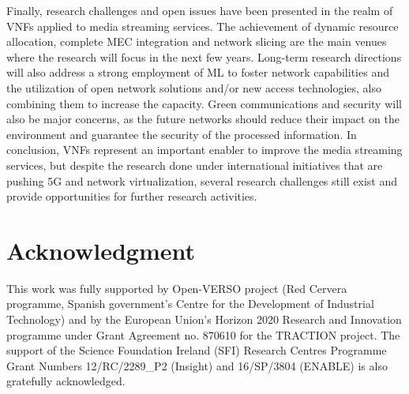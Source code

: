 Finally, research challenges and open issues have been presented in the realm of VNFs applied to media streaming services. The achievement of dynamic resource allocation, complete MEC integration and network slicing are the main venues where the research will focus in the next few years. Long-term research directions will also address a strong employment of ML to foster network capabilities and the utilization of open network solutions and/or new access technologies, also combining them to increase the capacity. Green communications and security will also be major concerns, as the future networks should reduce their impact on the environment and guarantee the security of the processed information. In conclusion, VNFs represent an important enabler to improve the media streaming services, but despite the research done under international initiatives that are pushing 5G and network virtualization, several research challenges still exist and provide opportunities for further research activities.


\section*{Acknowledgment}
This work was fully supported by Open-VERSO project (Red Cervera programme, Spanish government's Centre for the Development of Industrial Technology) and by the European Union's Horizon 2020 Research and Innovation programme under Grant Agreement no. 870610 for the TRACTION project. The support of the Science Foundation Ireland (SFI) Research Centres Programme Grant Numbers 12/RC/2289\_P2 (Insight) and 16/SP/3804 (ENABLE) is also gratefully acknowledged.
